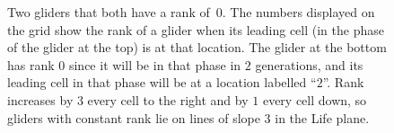 \begin{figure}[!ht]
	\centering
	\caption{Two gliders that both have a rank of~$0$. The numbers displayed on the grid show the rank of a glider when its leading cell (in the phase of the glider at the top) is at that location. The glider at the bottom has rank $0$ since it will be in that phase in $2$ generations, and its leading cell in that phase will be at a location labelled ``$2$''. Rank increases by $3$ every cell to the right and by $1$ every cell down, so gliders with constant rank lie on lines of slope $3$ in the Life plane.}\label{fig:glider_ranks}
\end{figure}

